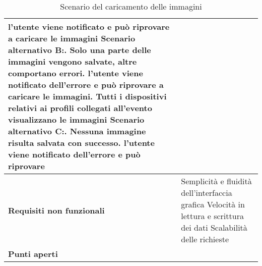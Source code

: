 \begin{table}[htb]
\begin{tabular} {|P{4.5cm}|P{11cm}|}
        l'utente viene notificato e può riprovare a caricare le immagini\newline
        Scenario alternativo B:. Solo una parte delle immagini vengono salvate, altre comportano errori. l'utente viene notificato dell'errore e può riprovare a caricare le immagini. Tutti i dispositivi relativi ai profili collegati all'evento visualizzano le immagini\newline
        Scenario alternativo C:. Nessuna immagine risulta salvata con successo. l'utente viene notificato dell'errore e può riprovare                                   \\
        \hline
        \textbf{Requisiti non funzionali} & Semplicità e fluidità dell'interfaccia grafica   \linebreak
        Velocità in lettura e scrittura dei dati\linebreak
        Scalabilità delle richieste                                                                                         \\
        \hline
        \textbf{Punti aperti}             &                                                                                 \\
        \hline
    \end{tabular}

    \caption{Scenario del caricamento delle immagini}
\end{table}
\clearpage


